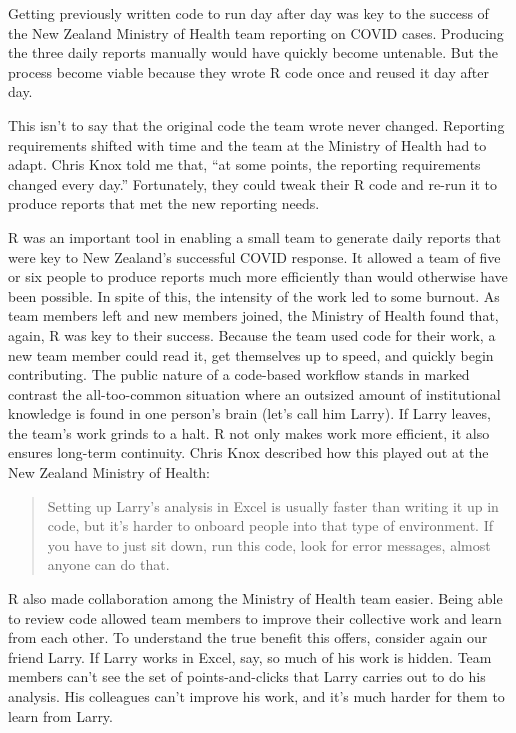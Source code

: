 \documentclass[
]{book}
\begin{document}
Getting previously written code to run day after day was key to the success of the New Zealand Ministry of Health team reporting on COVID cases. Producing the three daily reports manually would have quickly become untenable. But the process become viable because they wrote R code once and reused it day after day.

This isn't to say that the original code the team wrote never changed. Reporting requirements shifted with time and the team at the Ministry of Health had to adapt. Chris Knox told me that, ``at some points, the reporting requirements changed every day.'' Fortunately, they could tweak their R code and re-run it to produce reports that met the new reporting needs.

R was an important tool in enabling a small team to generate daily reports that were key to New Zealand's successful COVID response. It allowed a team of five or six people to produce reports much more efficiently than would otherwise have been possible. In spite of this, the intensity of the work led to some burnout. As team members left and new members joined, the Ministry of Health found that, again, R was key to their success. Because the team used code for their work, a new team member could read it, get themselves up to speed, and quickly begin contributing. The public nature of a code-based workflow stands in marked contrast the all-too-common situation where an outsized amount of institutional knowledge is found in one person's brain (let's call him Larry). If Larry leaves, the team's work grinds to a halt. R not only makes work more efficient, it also ensures long-term continuity. Chris Knox described how this played out at the New Zealand Ministry of Health:

\begin{quote}
Setting up Larry's analysis in Excel is usually faster than writing it up in code, but it's harder to onboard people into that type of environment. If you have to just sit down, run this code, look for error messages, almost anyone can do that.
\end{quote}

R also made collaboration among the Ministry of Health team easier. Being able to review code allowed team members to improve their collective work and learn from each other. To understand the true benefit this offers, consider again our friend Larry. If Larry works in Excel, say, so much of his work is hidden. Team members can't see the set of points-and-clicks that Larry carries out to do his analysis. His colleagues can't improve his work, and it's much harder for them to learn from Larry.
\end{document}

